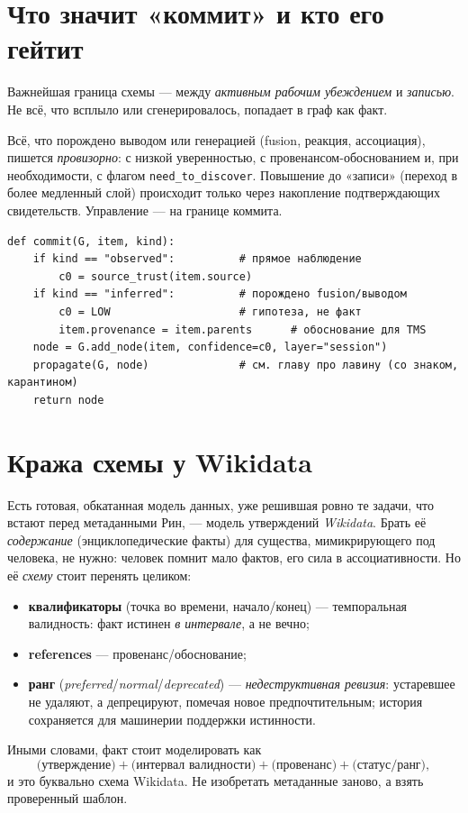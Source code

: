 \section{Что значит «коммит» и кто его гейтит}

Важнейшая граница схемы — между \emph{активным рабочим убеждением} и \emph{записью}.
Не всё, что всплыло или сгенерировалось, попадает в граф как факт.

\begin{principle}
Всё, что порождено выводом или генерацией (fusion, реакция, ассоциация), пишется
\emph{провизорно}: с низкой уверенностью, с провенансом-обоснованием и, при
необходимости, с флагом \texttt{need\_to\_discover}. Повышение до «записи» (переход
в более медленный слой) происходит только через накопление подтверждающих
свидетельств. Управление — на границе коммита.
\end{principle}

\begin{lstlisting}[style=pseudo]
def commit(G, item, kind):
    if kind == "observed":          # прямое наблюдение
        c0 = source_trust(item.source)
    if kind == "inferred":          # порождено fusion/выводом
        c0 = LOW                    # гипотеза, не факт
        item.provenance = item.parents      # обоснование для TMS
    node = G.add_node(item, confidence=c0, layer="session")
    propagate(G, node)              # см. главу про лавину (со знаком, карантином)
    return node
\end{lstlisting}

\section{Кража схемы у Wikidata}

Есть готовая, обкатанная модель данных, уже решившая ровно те задачи, что встают
перед метаданными Рин, — модель утверждений \emph{Wikidata}. Брать её
\emph{содержание} (энциклопедические факты) для существа, мимикрирующего под
человека, не нужно: человек помнит мало фактов, его сила в ассоциативности. Но её
\emph{схему} стоит перенять целиком:

\begin{itemize}
\item \textbf{квалификаторы} (точка во времени, начало/конец) — темпоральная
валидность: факт истинен \emph{в интервале}, а не вечно;
\item \textbf{references} — провенанс/обоснование;
\item \textbf{ранг} (\emph{preferred}/\emph{normal}/\emph{deprecated}) —
\emph{недеструктивная ревизия}: устаревшее не удаляют, а депрецируют, помечая новое
предпочтительным; история сохраняется для машинерии поддержки истинности.
\end{itemize}
Иными словами, факт стоит моделировать как
\[
\text{(утверждение)} + \text{(интервал валидности)} + \text{(провенанс)} +
\text{(статус/ранг)},
\]
и это буквально схема Wikidata. Не изобретать метаданные заново, а взять
проверенный шаблон.

